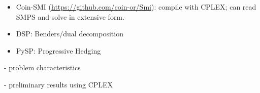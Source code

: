 \begin{itemize}
  \item Coin-SMI (\url{https://github.com/coin-or/Smi}): compile with CPLEX; can read SMPS and solve in extensive form.
  \item DSP: Benders/dual decomposition
  \item PySP: Progressive Hedging
\end{itemize}

- problem characteristics

- preliminary results using CPLEX
